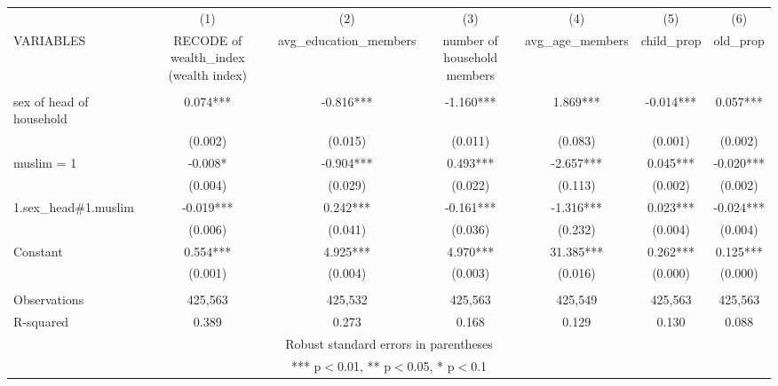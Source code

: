 \documentclass[]{article}
\begin{document}
\begin{tabular}{lcccccc} \hline
 & (1) & (2) & (3) & (4) & (5) & (6) \\
VARIABLES & RECODE of wealth\_index (wealth index) & avg\_education\_members & number of household members & avg\_age\_members & child\_prop & old\_prop \\ \hline
 &  &  &  &  &  &  \\
sex of head of household & 0.074*** & -0.816*** & -1.160*** & 1.869*** & -0.014*** & 0.057*** \\
 & (0.002) & (0.015) & (0.011) & (0.083) & (0.001) & (0.002) \\
muslim = 1 & -0.008* & -0.904*** & 0.493*** & -2.657*** & 0.045*** & -0.020*** \\
 & (0.004) & (0.029) & (0.022) & (0.113) & (0.002) & (0.002) \\
1.sex\_head\#1.muslim & -0.019*** & 0.242*** & -0.161*** & -1.316*** & 0.023*** & -0.024*** \\
 & (0.006) & (0.041) & (0.036) & (0.232) & (0.004) & (0.004) \\
Constant & 0.554*** & 4.925*** & 4.970*** & 31.385*** & 0.262*** & 0.125*** \\
 & (0.001) & (0.004) & (0.003) & (0.016) & (0.000) & (0.000) \\
 &  &  &  &  &  &  \\
Observations & 425,563 & 425,532 & 425,563 & 425,549 & 425,563 & 425,563 \\
 R-squared & 0.389 & 0.273 & 0.168 & 0.129 & 0.130 & 0.088 \\ \hline
\multicolumn{7}{c}{ Robust standard errors in parentheses} \\
\multicolumn{7}{c}{ *** p$<$0.01, ** p$<$0.05, * p$<$0.1} \\
\end{tabular}
\end{document}
